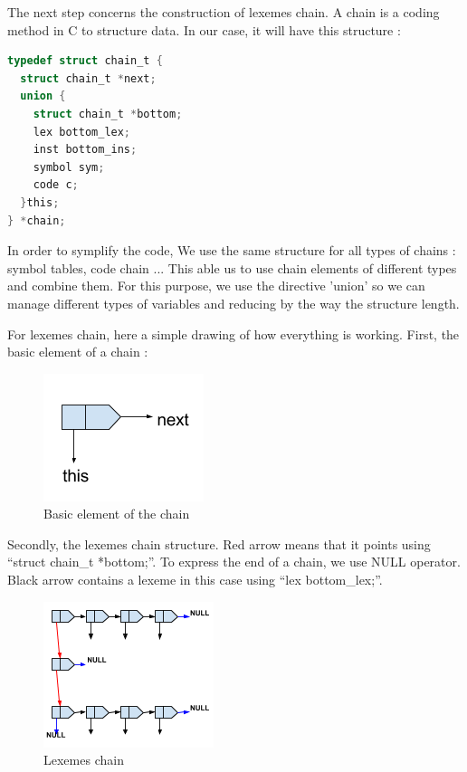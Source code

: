 \documentclass[twoside,twocolumn]{article}
\begin{document}
The next step concerns the construction of lexemes chain. A chain is a coding method in C to structure data. In our case, it will have this structure :

\begin{lstlisting}[language=C]
typedef struct chain_t {
  struct chain_t *next;
  union {
    struct chain_t *bottom;
    lex bottom_lex;
    inst bottom_ins;
    symbol sym;
    code c;
  }this;
} *chain;
\end{lstlisting}

In order to symplify the code, We use the same structure for all types of chains : symbol tables, code chain ... This able us to use chain elements of different types and combine them. For this purpose, we use the directive 'union' so we can manage different types of variables and reducing by the way the structure length.

For lexemes chain, here a simple drawing of how everything is working. First, the basic element of a chain :

\begin{figure}[h!]
\begin{center}
\includegraphics{images/basic_element.png} 
\end{center}
\caption{Basic element of the chain}
\label{Element}
\end{figure}

Secondly, the lexemes chain structure. Red arrow means that it points using ``struct chain\_t *bottom;''. To express the end of a chain, we use NULL operator. Black arrow contains a lexeme in this case using ``lex bottom\_lex;''.

\begin{figure}[h!]
\begin{center}
\includegraphics{images/lex_chain.png} 
\end{center}
\caption{Lexemes chain}
\label{Lex chain}
\end{figure}
\end{document}
